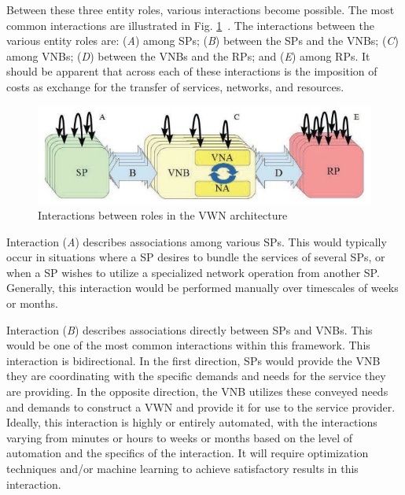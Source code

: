 \documentclass[12pt,dvipsnames]{report}
\begin{document}
Between these three entity roles, various interactions become possible.  The most common interactions are illustrated in Fig. \ref{fig:VWNArchitectureInteractions}~\cite{MJ_MECOMM_17}.  The interactions between the various entity roles are: (\emph{A}) among SPs; (\emph{B}) between the SPs and the VNBs; (\emph{C}) among VNBs; (\emph{D}) between the VNBs and the RPs; and (\emph{E}) among RPs.  It should be apparent that across each of these interactions is the imposition of costs as exchange for the transfer of services, networks, and resources.

\begin{figure}
	\centering
	\includegraphics[width=\linewidth]{VWNArchitectureInteractions}
	\caption[Interactions between roles in the VWN architecture]{\small Interactions between roles in the VWN architecture~\cite{MJ_MECOMM_17}}
	\label{fig:VWNArchitectureInteractions}
\end{figure}

Interaction (\emph{A}) describes associations among various SPs.  This would typically occur in situations where a SP desires to bundle the services of several SPs, or when a SP wishes to utilize a specialized network operation from another SP.  Generally, this interaction would be performed manually over timescales of weeks or months.

Interaction (\emph{B}) describes associations directly between SPs and VNBs.  This would be one of the most common interactions within this framework.  This interaction is bidirectional.  In  the first direction, SPs would provide the VNB they are coordinating with the specific demands and needs for the service they are providing.  In the opposite direction, the VNB utilizes these conveyed needs and demands to construct a VWN and provide it for use to the service provider.  Ideally, this interaction is highly or entirely automated, with the interactions varying from minutes or hours to weeks or months based on the level of automation and the specifics of the interaction.  It will require optimization techniques and/or machine learning to achieve satisfactory results in this interaction.
\end{document}
